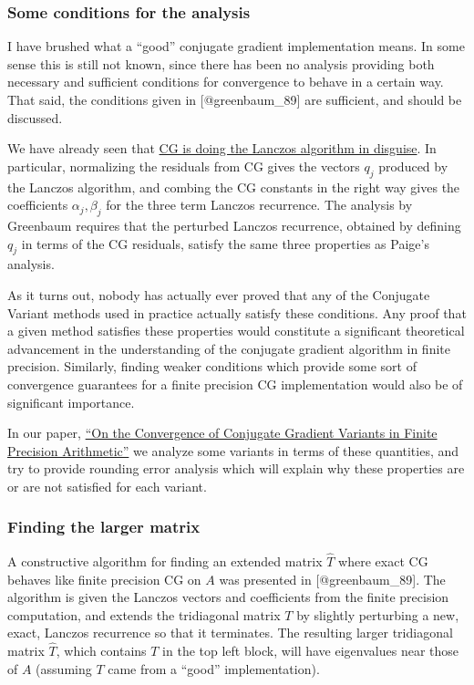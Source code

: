 \documentclass[10pt]{article}
\begin{document}
\subsubsection{Some conditions for the analysis}

I have brushed what a ``good'' conjugate gradient implementation means.
In some sense this is still not known, since there has been no analysis providing both necessary and sufficient conditions for convergence to behave in a certain way.
That said, the conditions given in {[}@greenbaum\_89{]} are sufficient, and should be discussed.

We have already seen that \href{./cg_lanczos.html}{CG is doing the Lanczos algorithm in disguise}.
In particular, normalizing the residuals from CG gives the vectors \(q_j\) produced by the Lanczos algorithm, and combing the CG constants in the right way gives the coefficients \(\alpha_j,\beta_j\) for the three term Lanczos recurrence.
The analysis by Greenbaum requires that the perturbed Lanczos recurrence, obtained by defining \(q_j\) in terms of the CG residuals, satisfy the same three properties as Paige's analysis.

As it turns out, nobody has actually ever proved that any of the Conjugate Variant methods used in practice actually satisfy these conditions.
Any proof that a given method satisfies these properties would constitute a significant theoretical advancement in the understanding of the conjugate gradient algorithm in finite precision.
Similarly, finding weaker conditions which provide some sort of convergence guarantees for a finite precision CG implementation would also be of significant importance.

In our paper, \href{./../publications/greenbaum_liu_chen_19.html}{``On the Convergence of Conjugate Gradient Variants in Finite Precision Arithmetic''} we analyze some variants in terms of these quantities, and try to provide rounding error analysis which will explain why these properties are or are not satisfied for each variant.

\subsubsection{Finding the larger matrix}

A constructive algorithm for finding an extended matrix \(\hat{T}\) where exact CG behaves like finite precision CG on \(A\) was presented in {[}@greenbaum\_89{]}.
The algorithm is given the Lanczos vectors and coefficients from the finite precision computation, and extends the tridiagonal matrix \(T\) by slightly perturbing a new, exact, Lanczos recurrence so that it terminates. The resulting larger tridiagonal matrix \(\hat{T}\), which contains \(T\) in the top left block, will have eigenvalues near those of \(A\) (assuming \(T\) came from a ``good'' implementation).
\end{document}
